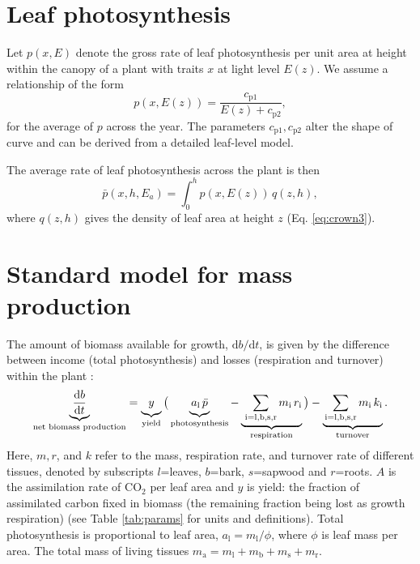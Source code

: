 \documentclass[10pt,twoside]{article}
\begin{document}
\section{Leaf photosynthesis}\label{leaf-photosynthesis}

Let \(p(x,E)\) denote the gross rate of leaf photosynthesis per unit
area at height within the canopy of a plant with traits \(x\) at light
level \(E(z)\). We assume a relationship of the form
\begin{equation}\label{eq:photosynthesis}
p(x,E(z))=\frac{c_\textrm{p1}}{E(z)+c_\textrm{p2}},
\end{equation}
for the average of \(p\) across the year. The parameters
\(c_\textrm{p1}, c_\textrm{p2}\) alter the shape of curve and can be
derived from a detailed leaf-level model.

The average rate of leaf photosynthesis across the plant is then
\begin{equation}\label{eq:photosynthesis_av}
\bar{p}(x,h,E_a)=\int_0^h p(x,E(z)) \, q(z, h),
\end{equation}
where \(q(z, h)\) gives the density of leaf area at height \(z\) (Eq.
\ref{eq:crown3}).

\section{Standard model for mass
production}\label{standard-model-for-mass-production}

The amount of biomass available for growth,
\(\textrm{d}b / \textrm{d}t\), is given by the difference between income
(total photosynthesis) and losses (respiration and turnover) within the
plant \citep{Makela-1997, Thornley-2000, Falster-2011}:
\begin{equation}\label{eq:dbdt}
\underbrace{\strut \frac{\textrm{d}b}{\textrm{d}t}}_\textrm{net biomass production}
  = \underbrace{\strut y}_\textrm{yield}
    \big( \underbrace{\strut a_\textrm{l} \, \bar{p}}_\textrm{photosynthesis} -
     \underbrace{\strut \,\sum_\textrm{i=l,b,s,r}{m_\textrm{i} \, r_\textrm{i}}}_\textrm{respiration}\big)
    - \underbrace{\strut \sum_\textrm{i=l,b,s,r}{m_\textrm{i} \, k_\textrm{i}}}_\textrm{turnover}.
\end{equation}
Here, \(m,r\), and \(k\) refer to the mass, respiration rate, and
turnover rate of different tissues, denoted by subscripts \(l\)=leaves,
\(b\)=bark, \(s\)=sapwood and \(r\)=roots. \(A\) is the assimilation
rate of CO\(_2\) per leaf area and \(y\) is yield: the fraction of
assimilated carbon fixed in biomass (the remaining fraction being lost
as growth respiration) (see Table \ref{tab:params} for units and
definitions). Total photosynthesis is proportional to leaf area,
\(a_\textrm{l} = m_\textrm{l} / \phi\), where \(\phi\) is leaf mass per
area. The total mass of living tissues
\(m_\textrm{a}=m_\textrm{l}+m_\textrm{b}+m_\textrm{s}+m_\textrm{r}.\)
\end{document}
